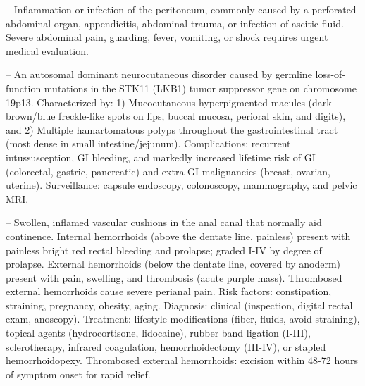 -- Inflammation or infection of the peritoneum, commonly caused by a perforated abdominal organ, appendicitis, abdominal trauma, or infection of ascitic fluid. Severe abdominal pain, guarding, fever, vomiting, or shock requires urgent medical evaluation.

-- An autosomal dominant neurocutaneous disorder caused by germline loss-of-function mutations in the STK11 (LKB1) tumor suppressor gene on chromosome 19p13. Characterized by: 1) Mucocutaneous hyperpigmented macules (dark brown/blue freckle-like spots on lips, buccal mucosa, perioral skin, and digits), and 2) Multiple hamartomatous polyps throughout the gastrointestinal tract (most dense in small intestine/jejunum). Complications: recurrent intussusception, GI bleeding, and markedly increased lifetime risk of GI (colorectal, gastric, pancreatic) and extra-GI malignancies (breast, ovarian, uterine). Surveillance: capsule endoscopy, colonoscopy, mammography, and pelvic MRI.

-- Swollen, inflamed vascular cushions in the anal canal that normally aid continence. Internal hemorrhoids (above the dentate line, painless) present with painless bright red rectal bleeding and prolapse; graded I-IV by degree of prolapse. External hemorrhoids (below the dentate line, covered by anoderm) present with pain, swelling, and thrombosis (acute purple mass). Thrombosed external hemorrhoids cause severe perianal pain. Risk factors: constipation, straining, pregnancy, obesity, aging. Diagnosis: clinical (inspection, digital rectal exam, anoscopy). Treatment: lifestyle modifications (fiber, fluids, avoid straining), topical agents (hydrocortisone, lidocaine), rubber band ligation (I-III), sclerotherapy, infrared coagulation, hemorrhoidectomy (III-IV), or stapled hemorrhoidopexy. Thrombosed external hemorrhoids: excision within 48-72 hours of symptom onset for rapid relief.


